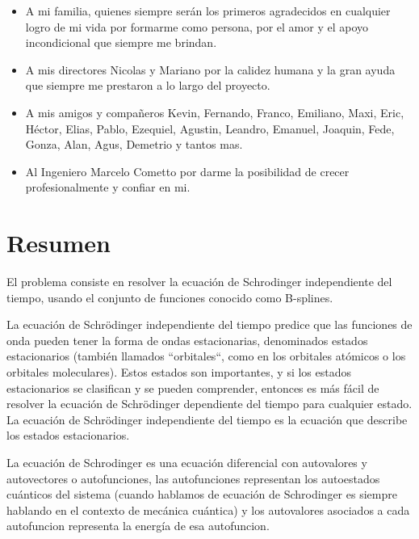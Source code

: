 \documentclass[a4paper,openright,12pt, oneside]{book}
\begin{document}
\begin{itemize}
\item A mi familia, quienes siempre ser\'an los primeros agradecidos en
cualquier logro de mi vida por formarme como persona, por el amor y el apoyo incondicional que siempre me brindan.

\item A mis directores Nicolas y Mariano por la calidez humana y la gran ayuda que siempre me prestaron a lo largo del proyecto.

\item A mis amigos y compa\~neros Kevin, Fernando, Franco, Emiliano, Maxi, Eric, H\'ector, Elias, Pablo, Ezequiel, Agustin, Leandro, Emanuel, Joaquin, Fede, Gonza, Alan, Agus, Demetrio y tantos mas.

\item Al Ingeniero Marcelo Cometto por darme la posibilidad de crecer profesionalmente y confiar en mi.
\end{itemize}

\chapter*{\hspace{0.65cm}Resumen} %

El problema consiste en resolver la ecuaci\'on de Schrodinger independiente del tiempo, usando el conjunto de funciones conocido como B-splines.

La ecuaci\'on de Schr\"odinger independiente del tiempo predice que las funciones de onda pueden tener la forma de ondas estacionarias, denominados estados estacionarios (tambi\'en llamados ``orbitales``, como en los orbitales at\'omicos o los orbitales moleculares). Estos estados son importantes, y si los estados estacionarios se clasifican y se pueden comprender, entonces es m\'as f\'acil de resolver la ecuaci\'on de Schr\"odinger dependiente del tiempo para cualquier estado. La ecuaci\'on de Schr\"odinger independiente del tiempo es la ecuaci\'on que describe los estados estacionarios.

La ecuaci\'on de Schrodinger es una ecuaci\'on diferencial con autovalores y 
autovectores o autofunciones, las autofunciones representan los autoestados cu\'anticos del sistema 
(cuando hablamos de ecuaci\'on de Schrodinger es siempre hablando en el contexto de mec\'anica cu\'antica) y 
los autovalores asociados a cada autofuncion representa la energ\'ia de esa autofuncion.
\end{document}
